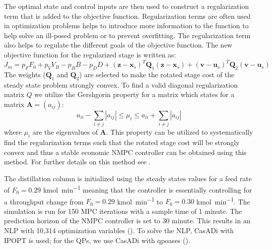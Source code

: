 The optimal state and control inputs are then used to construct a regularization term that is added to the objective function.
Regularization terms are often used in optimization problems  helps to introduce more information to the function to help solve an ill-posed problem or to prevent overfitting.
The regularization term also helps to regulate the different goals of the objective function.
The new objective function for the regularized stage is written as:
\begin{equation}
	J_m = p_FF_0 + p_VV_B-p_BB-p_DD+(\boldsymbol{z}-\boldsymbol{x}_s)^T\boldsymbol{Q}_1(\boldsymbol{z}-\boldsymbol{x}_s)+(\boldsymbol{v}-\boldsymbol{u}_s)^T\boldsymbol{Q}_2(\boldsymbol{v}-\boldsymbol{u}_s)
\end{equation}
The weights ($\boldsymbol{Q}_1$ and $\boldsymbol{Q}_2$) are selected to make the rotated stage cost of the steady state problem strongly convex. 
To find a valid diagonal regularization matrix $Q$ we utilize the Gershgorin property for a matrix which states for a matrix $\boldsymbol{A}=(a_{ij})$:
	\begin{equation}
		a_{ii}-\sum_{i\neq j}|a_{ij}|\leq \mu_i\leq a_{ii}+\sum_{i\neq j} |a_{ij}|
	\end{equation}
where $\mu_i$ are the eigenvalues of $\boldsymbol{A}$\cite{fast}.
This property can be utilized to systematically find the regularization terms such that the rotated stage cost will be strongly convex and thus
a stable economic NMPC controller can be obtained using this method.
For further details on this method see \cite{fast}.
\par
The distillation column is initialized using the steady states values for a feed rate of $F_0 = 0.29$ \si{\kilo\mole\per\minute} meaning that the controller is essentially controlling for a throughput change from $F_0 = 0.29$ \si{\kilo\mole\per\minute} to $F_0 = 0.30$ \si{\kilo\mole\per\minute}.
The simulation is run for 150 MPC iterations with a sample time of 1 minute.
The prediction horizon of the NMPC controller is set to 30 minute.
This results in an NLP with 10,314 optimization variables (\cite{economic}).
To solve the NLP, CasADi with IPOPT is used; for the QPs, we use CasADi with qpoases (\cite{Andersson2013b}).

